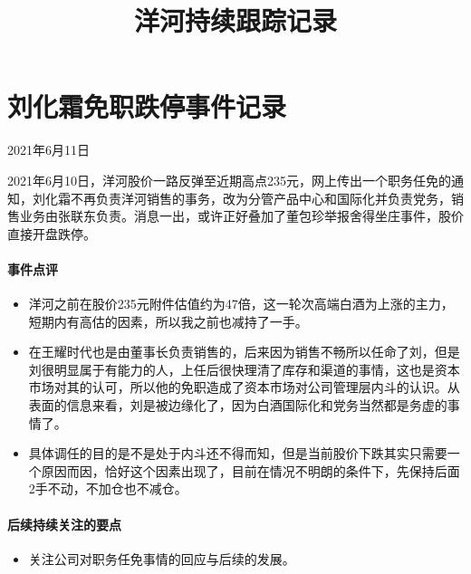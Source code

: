 \documentclass[a4paper,12pt,lang=cn,fontset = windows]{elegantpaper} %
\title{洋河持续跟踪记录}
\author{}
\date{}
\begin{document}
\maketitle
\section{刘化霜免职跌停事件记录}
\begin{flushright}
    2021年6月11日
\end{flushright}

2021年6月10日，洋河股价一路反弹至近期高点235元，网上传出一个职务任免的通知，刘化霜不再负责洋河销售的事务，改为分管产品中心和国际化并负责党务，销售业务由张联东负责。消息一出，或许正好叠加了董包珍举报舍得坐庄事件，股价直接开盘跌停。
\paragraph{事件点评}
\begin{itemize}
    \item 洋河之前在股价235元附件估值约为47倍，这一轮次高端白酒为上涨的主力，短期内有高估的因素，所以我之前也减持了一手。
    \item 在王耀时代也是由董事长负责销售的，后来因为销售不畅所以任命了刘，但是刘很明显属于有能力的人，上任后很快理清了库存和渠道的事情，这也是资本市场对其的认可，所以他的免职造成了资本市场对公司管理层内斗的认识。从表面的信息来看，刘是被边缘化了，因为白酒国际化和党务当然都是务虚的事情了。
    \item 具体调任的目的是不是处于内斗还不得而知，但是当前股价下跌其实只需要一个原因而因，恰好这个因素出现了，目前在情况不明朗的条件下，先保持后面2手不动，不加仓也不减仓。
\end{itemize}
\paragraph{后续持续关注的要点}
\begin{itemize}
    \item 关注公司对职务任免事情的回应与后续的发展。
    \end{itemize}
\end{document}
